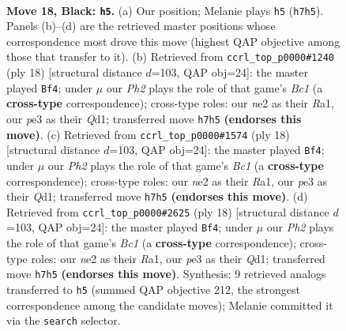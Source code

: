 \documentclass[11pt]{article}
\begin{document}
\clearpage

\begin{figure}[p]\centering
\begin{subfigure}{0.46\textwidth}\centering
\resizebox{\linewidth}{!}{%
\newchessgame
\chessboard[
  setfen={rnr2bk1/1p1b1ppp/p1q1pn2/B7/7N/3BP3/PP2NPPP/R2Q1RK1 b - - 17 18},
  showmover=false,
  pgfstyle=straightmove, color=movearrow, markmove={h7-h5}
]}
\caption{}
\end{subfigure}\hfill
\begin{subfigure}{0.46\textwidth}\centering
\resizebox{\linewidth}{!}{%
\newchessgame
\chessboard[
  setfen={rnbqr1k1/pp3pbp/3p1np1/2pP4/8/2N2NP1/PP2PPBP/R1BQ1RK1 w - - 6 10},
  showmover=false,
  pgfstyle=straightmove, color=movearrow, markmove={c1-f4}
]}
\caption{}
\end{subfigure}
\\[4pt]
\begin{subfigure}{0.46\textwidth}\centering
\resizebox{\linewidth}{!}{%
\newchessgame
\chessboard[
  setfen={rnbqr1k1/pp3pbp/3p1np1/2pP4/8/2N2NP1/PP2PPBP/R1BQ1RK1 w - - 6 10},
  showmover=false,
  pgfstyle=straightmove, color=movearrow, markmove={c1-f4}
]}
\caption{}
\end{subfigure}\hfill
\begin{subfigure}{0.46\textwidth}\centering
\resizebox{\linewidth}{!}{%
\newchessgame
\chessboard[
  setfen={rnbqr1k1/pp3pbp/3p1np1/2pP4/8/2N2NP1/PP2PPBP/R1BQ1RK1 w - - 1 10},
  showmover=false,
  pgfstyle=straightmove, color=movearrow, markmove={c1-f4}
]}
\caption{}
\end{subfigure}
\caption{\textbf{Move 18, Black: \texttt{h5}.} (a) Our position; Melanie plays \texttt{h5} (\texttt{h7h5}). Panels (b)--(d) are the retrieved master positions whose correspondence most drove this move (highest QAP objective among those that transfer to it). (b) Retrieved from \texttt{ccrl\_top\_p0000\#1240} (ply 18) [structural distance $d$=103, QAP obj=24]: the master played \texttt{Bf4}; under $\mu$ our \emph{Ph2} plays the role of that game's \emph{Bc1} (a \textbf{cross-type} correspondence); cross-type roles: our \emph{n}e2 as their \emph{R}a1, our \emph{p}e3 as their \emph{Q}d1; transferred move \texttt{h7h5} \textbf{(endorses this move)}. (c) Retrieved from \texttt{ccrl\_top\_p0000\#1574} (ply 18) [structural distance $d$=103, QAP obj=24]: the master played \texttt{Bf4}; under $\mu$ our \emph{Ph2} plays the role of that game's \emph{Bc1} (a \textbf{cross-type} correspondence); cross-type roles: our \emph{n}e2 as their \emph{R}a1, our \emph{p}e3 as their \emph{Q}d1; transferred move \texttt{h7h5} \textbf{(endorses this move)}. (d) Retrieved from \texttt{ccrl\_top\_p0000\#2625} (ply 18) [structural distance $d$=103, QAP obj=24]: the master played \texttt{Bf4}; under $\mu$ our \emph{Ph2} plays the role of that game's \emph{Bc1} (a \textbf{cross-type} correspondence); cross-type roles: our \emph{n}e2 as their \emph{R}a1, our \emph{p}e3 as their \emph{Q}d1; transferred move \texttt{h7h5} \textbf{(endorses this move)}. Synthesis: 9 retrieved analogs transferred to \texttt{h5} (summed QAP objective 212, the strongest correspondence among the candidate moves); Melanie committed it via the \texttt{search} selector.}
\label{fig:thought-m35}
\end{figure}
\end{document}
